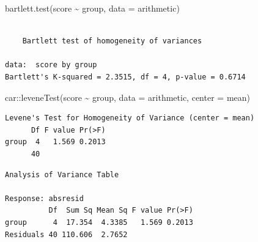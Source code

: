 \documentclass[
  11pt,
  letterpaper,
]{scrbook}
\newenvironment{Shaded}{\begin{snugshade}}{\end{snugshade}}
\newcommand{\AttributeTok}[1]{\textcolor[rgb]{0.40,0.45,0.13}{#1}}
\newcommand{\CommentTok}[1]{\textcolor[rgb]{0.37,0.37,0.37}{#1}}
\newcommand{\FunctionTok}[1]{\textcolor[rgb]{0.28,0.35,0.67}{#1}}
\newcommand{\NormalTok}[1]{\textcolor[rgb]{0.00,0.23,0.31}{#1}}
\newcommand{\OtherTok}[1]{\textcolor[rgb]{0.00,0.23,0.31}{#1}}
\newcommand{\SpecialCharTok}[1]{\textcolor[rgb]{0.37,0.37,0.37}{#1}}
\theoremstyle{definition}
\theoremstyle{remark}
\begin{document}
\begin{Shaded}
\begin{Highlighting}[]
\FunctionTok{bartlett.test}\NormalTok{(score }\SpecialCharTok{\textasciitilde{}}\NormalTok{ group,}
              \AttributeTok{data =}\NormalTok{ arithmetic)}
\end{Highlighting}
\end{Shaded}

\begin{verbatim}

    Bartlett test of homogeneity of variances

data:  score by group
Bartlett's K-squared = 2.3515, df = 4, p-value = 0.6714
\end{verbatim}

\begin{Shaded}
\begin{Highlighting}[]
\NormalTok{car}\SpecialCharTok{::}\FunctionTok{leveneTest}\NormalTok{(score }\SpecialCharTok{\textasciitilde{}}\NormalTok{ group,}
                \AttributeTok{data =}\NormalTok{ arithmetic,}
                \AttributeTok{center =}\NormalTok{ mean)}
\end{Highlighting}
\end{Shaded}

\begin{verbatim}
Levene's Test for Homogeneity of Variance (center = mean)
      Df F value Pr(>F)
group  4   1.569 0.2013
      40               
\end{verbatim}

\begin{Shaded}
\end{Shaded}

\begin{verbatim}
Analysis of Variance Table

Response: absresid
          Df  Sum Sq Mean Sq F value Pr(>F)
group      4  17.354  4.3385   1.569 0.2013
Residuals 40 110.606  2.7652               
\end{verbatim}
\end{document}
